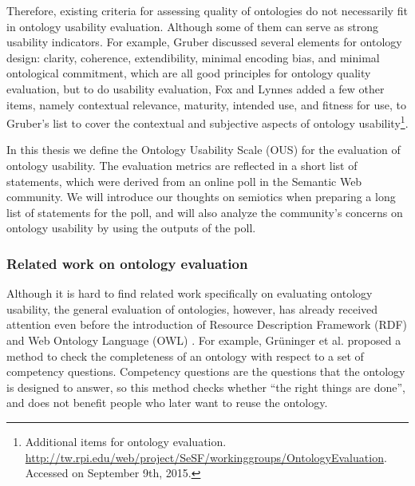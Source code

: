 Therefore, existing criteria for assessing quality of ontologies do not necessarily fit in ontology usability evaluation. Although some of them can serve as strong usability indicators. For example, Gruber \cite{gruber1995toward}
discussed several elements for ontology design: clarity, coherence, extendibility, minimal encoding bias, and minimal ontological commitment, which are all good principles for ontology quality evaluation, but to do usability evaluation, Fox and Lynnes added a few other items, namely contextual relevance, maturity, intended use, and fitness for use, to Gruber's list to cover the contextual and subjective aspects of ontology usability\footnote{Additional items for ontology evaluation. \url{http://tw.rpi.edu/web/project/SeSF/workinggroups/OntologyEvaluation}. Accessed on September 9th, 2015.}.

In this thesis we define the Ontology Usability Scale (OUS) for the evaluation of ontology usability. The evaluation metrics are reflected in a short list of statements, which were derived from an online poll in the Semantic Web community. We will introduce our thoughts on semiotics when preparing a long list of statements for the poll, and will also analyze the community's concerns on ontology usability by using the outputs of the poll.

\subsubsection{Related work on ontology evaluation}
Although it is hard to find related work specifically on evaluating ontology usability, the general evaluation of ontologies, however, has already received attention even before the introduction of Resource Description Framework (RDF) \cite{brickley2000resource} and Web Ontology Language (OWL) \cite{mcguinness2004owl}. For example, Gr{\"u}ninger et al. \cite{gruninger1995methodology} proposed a method to check the completeness of an ontology with respect to a set of competency questions. Competency questions are the questions that the ontology is designed to answer, so this method checks whether ``the right things are done'', and does not benefit people who later want to reuse the ontology.


